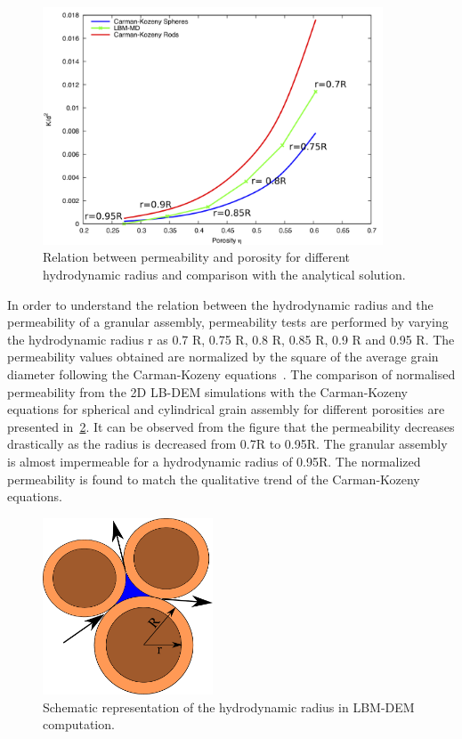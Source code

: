 \documentclass[12pt,twoside]{tuhhproc-en}
\begin{document}
\begin{figure}[htpb]
\centering
\includegraphics[width=0.9\textwidth]{figs/Carman}
\caption{Relation between permeability and porosity for 
different hydrodynamic radius and comparison with the analytical solution.}
\label{fig:Carman}
\end{figure}

In order to understand the relation between the hydrodynamic radius and the permeability of a granular assembly, permeability tests are performed by varying the hydrodynamic radius r as 0.7 R, 0.75 R, 0.8 R, 0.85 R, 0.9 R and 0.95 R. The permeability values obtained are normalized by the square of the average grain diameter following the Carman-Kozeny equations~\citep{Yazdchi2011}. The comparison of normalised permeability from the 2D LB-DEM simulations with the Carman-Kozeny equations for spherical and cylindrical grain assembly for different porosities are presented in~\cref{fig:reduction}. It can be observed from the figure that the permeability decreases drastically as the radius is decreased from 0.7R to 0.95R. The granular assembly is almost impermeable for a hydrodynamic radius of 0.95R. The normalized permeability is found to match the qualitative trend of the Carman-Kozeny equations.

\begin{figure}[tbhp]
\centering
\includegraphics[width=0.45\textwidth]{figs/reduction}
\caption{Schematic representation of the hydrodynamic radius in LBM-DEM 
computation.}
\label{fig:reduction}
\end{figure}
\end{document}
